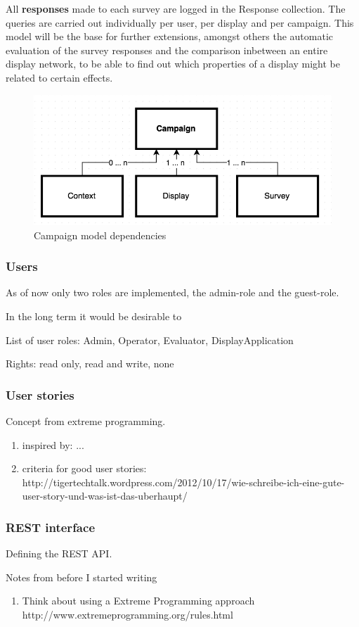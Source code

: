 All \textbf{responses} made to each survey are logged in the Response collection. The queries are carried out individually per user, per display and per campaign. This model will be the base for further extensions, amongst others the automatic evaluation of the survey responses and the comparison inbetween an entire display network, to be able to find out which properties of a display might be related to certain effects.

\begin{figure}%
    \begin{center}
        \includegraphics[width=.8\columnwidth]{img/4_implementation/4-dependency-campaign}
    \end{center}
 \caption{Campaign model dependencies}
 \label{fig:4-dependency-campaign}
\end{figure}



\subsubsection{Users}

As of now only two roles are implemented, the admin-role and the guest-role.

In the long term it would be desirable to 

List of user roles: Admin, Operator, Evaluator, DisplayApplication

Rights: read only,  read and write, none


\subsubsection{User stories}

Concept from extreme programming.

\begin{enumerate}
\item inspired by: ...
\item criteria for good user stories: http://tigertechtalk.wordpress.com/2012/10/17/wie-schreibe-ich-eine-gute-user-story-und-was-ist-das-uberhaupt/
\end{enumerate}


\subsubsection{REST interface}

Defining the REST API. 


Notes from before I started writing
\begin{enumerate}
\item Think about using a Extreme Programming approach http://www.extremeprogramming.org/rules.html
\end{enumerate}